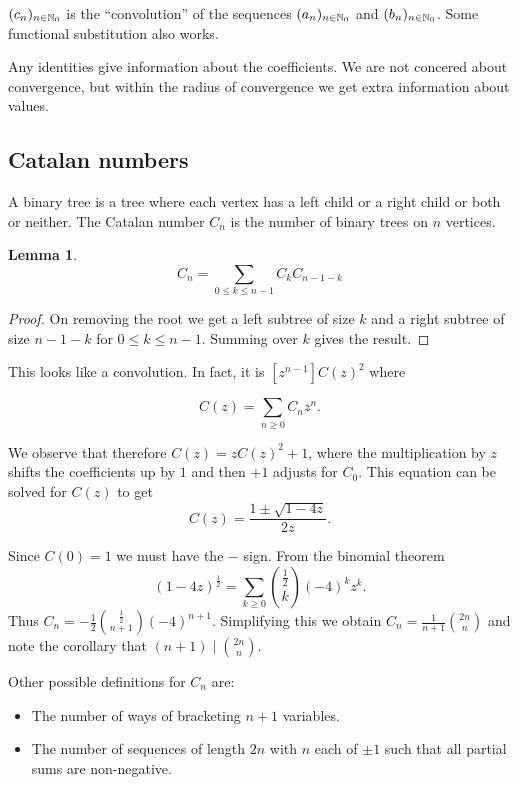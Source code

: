 \documentclass{notes}
\theoremstyle{plain}
\newtheorem{lemma}{Lemma}[chapter]
\begin{document}
$(c_n)_{n \in \mathbb{N}_0}$ is the ``convolution'' of the sequences
$(a_n)_{n \in \mathbb{N}_0}$ and $(b_n)_{n \in \mathbb{N}_0}$.  Some functional
substitution also works.

Any identities give information about the
coefficients. We are not concered about convergence, but within the
radius of convergence we get extra information about values.

\subsection{Catalan numbers}

A binary tree is a tree where each vertex has a left child or a right child
or both or neither.  The Catalan number $C_n$ is the number of binary
trees on $n$ vertices.

\begin{lemma}
\[
C_n = \sum_{0 \le k \le n-1} C_k C_{n-1-k}
\]
\end{lemma}

\begin{proof}
On removing the root we get a left subtree of size $k$ and a right subtree
of size $n-1-k$ for $0 \le k \le n-1$.  Summing over $k$ gives the result.
\end{proof}

This looks like a convolution.  In fact, it is $[z^{n-1}]C(z)^2$
where

\[
C(z) = \sum_{n \ge 0} C_n z^n.
\]

We observe that therefore
$C(z) = z C(z)^2 + 1$, where the multiplication by $z$ shifts the coefficients
up by $1$ and then $+1$ adjusts for $C_0$.  This equation can be solved
for $C(z)$ to get
\[
C(z) = \frac{1  \pm \sqrt{1-4 z}}{2 z}.
\]

Since $C(0) = 1$ we must have the $-$ sign.  From the binomial theorem
\[
(1-4z)^{\frac{1}{2}} = \sum_{k \ge 0} \binom{\frac{1}{2}}{k} (-4)^k z^k.
\]
Thus $C_n = - \frac{1}{2} \binom{\frac{1}{2}}{n+1} (-4)^{n+1}$.  Simplifying
this we obtain $C_n = \frac{1}{n+1} \binom{2 n}{n}$ and note the corollary
that $(n+1) \mid \binom{2 n}{n}$.

Other possible definitions for $C_n$ are:
\begin{itemize}
\item The number of ways of bracketing $n+1$ variables.
\item The number of sequences of length $2n$ with $n$ each of $\pm 1$ such
that all partial sums are non-negative.
\end{itemize}
\end{document}

